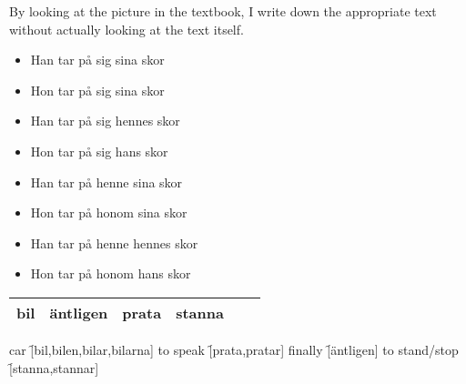 
\begin{flushleft}
    By looking at the picture in the textbook,
    I write down the appropriate text without actually looking at
    the text itself.
    \begin{itemize}
        \item Han tar på sig sina skor
        \item Hon tar på sig sina skor
        \item Han tar på sig hennes skor
        \item Hon tar på sig hans skor
        \item Han tar på henne sina skor
        \item Hon tar på honom sina skor
        \item Han tar på henne hennes skor
        \item Hon tar på honom hans skor
    \end{itemize}
\end{flushleft}

\begin{center}
    \begin{tabular}{|c c c c c c|}
        \hline
        bil & äntligen & prata & stanna &  & \\
        \hline
    \end{tabular}
\end{center}

\begin{questions}
    \begin{multicols}{2}
        \raggedcolumns
        \question car \f[bil,bilen,bilar,bilarna]
        \question to speak \f[prata,pratar]
        \question finally \f[äntligen]
        \question to stand/stop \f[stanna,stannar]
    \end{multicols}
\end{questions}